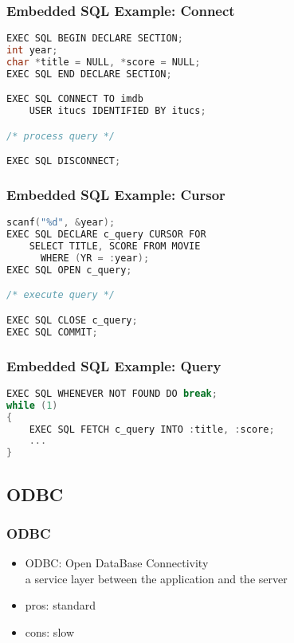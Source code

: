 \documentclass[dvipsnames]{beamer}
\theoremstyle{plain}
\begin{document}
\begin{frame}[fragile]
  \frametitle{Embedded SQL Example: Connect}

  \begin{lstlisting}[language=C]
EXEC SQL BEGIN DECLARE SECTION;
int year;
char *title = NULL, *score = NULL;
EXEC SQL END DECLARE SECTION;

EXEC SQL CONNECT TO imdb
    USER itucs IDENTIFIED BY itucs;

/* process query */

EXEC SQL DISCONNECT;
  \end{lstlisting}
\end{frame}

\begin{frame}[fragile]
  \frametitle{Embedded SQL Example: Cursor}

  \begin{lstlisting}[language=C]
scanf("%d", &year);
EXEC SQL DECLARE c_query CURSOR FOR
    SELECT TITLE, SCORE FROM MOVIE
      WHERE (YR = :year);
EXEC SQL OPEN c_query;

/* execute query */

EXEC SQL CLOSE c_query;
EXEC SQL COMMIT;
  \end{lstlisting}
\end{frame}

\begin{frame}[fragile]
  \frametitle{Embedded SQL Example: Query}

  \begin{lstlisting}[language=C]
EXEC SQL WHENEVER NOT FOUND DO break;
while (1)
{
    EXEC SQL FETCH c_query INTO :title, :score;
    ...
}
  \end{lstlisting}
\end{frame}

\subsection{ODBC}

\lstset{language=ExtendedPHP}

\begin{frame}[label=odbc]
  \frametitle{ODBC}

  \begin{itemize}
    \item \alert{ODBC}: Open DataBase Connectivity\\
      a service layer between the application and the server

    \bigskip
    \item pros: standard
    \item cons: slow
  \end{itemize}
\end{frame}
\end{document}
